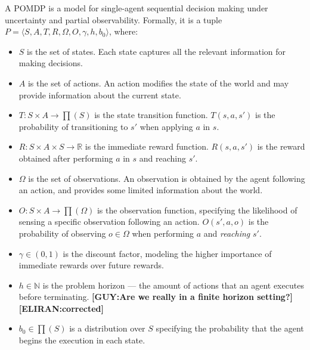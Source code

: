 \documentclass[letterpaper]{article} %
\newcommand{\eliran}[1]{\textbf{[\color{red}ELIRAN:#1]}}
\newcommand{\guy}[1]{\textbf{[\color{orange}GUY:#1]}}
\begin{document}
A POMDP is a model for single-agent sequential decision making under uncertainty and partial observability.
Formally, it is a tuple $P=\langle S, A, T, R, \Omega, O, \gamma, h, b_0 \rangle$, where:
\begin{itemize}
\item
$S$ is the set of states. Each state captures all the relevant information for making decisions.
\item
$A$ is the set of actions. An action modifies the state of the world and may provide information about the current state.
\item
$T: S \times A \rightarrow \prod(S)$ is the state transition function.  $T(s, a, s')$ is the probability of transitioning to $s'$ when applying $a$ in $s$. 
\item
$R:S \times A \times S \rightarrow \mathbb{R}$  is the immediate reward function. $R(s,a, s')$ is the reward obtained after performing $a$ in $s$  and reaching $s'$. 
\item
$\Omega$ is the set of observations. An observation is obtained by the agent following an action, and provides some limited information about the world.
\item
$O:S \times A \rightarrow \prod (\Omega)$ is the observation function, specifying the likelihood of sensing a specific observation following an action. $O(s', a, o)$ is the probability of observing $o\in \Omega$ when performing $a$ and \emph{reaching} $s'$. 
\item
$\gamma \in (0,1)$ is the discount factor, modeling the higher importance of immediate rewards over future rewards.
\item
$h\in\mathbb{N}$ is the problem horizon --- the  amount of actions that an agent executes before terminating. \guy{Are we really in a finite horizon setting?}\eliran{corrected}
\item
$b_0\in \prod(S)$ is a distribution over $S$ specifying the probability that the agent begins the execution in each state.
\end{itemize}
\end{document}
